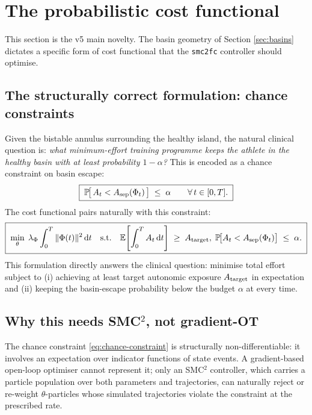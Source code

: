 \documentclass[11pt,a4paper]{article}
\theoremstyle{definition}
\newcommand{\dd}{\mathrm{d}}
\newcommand{\Ecal}{\mathbb{E}}
\newcommand{\Pcal}{\mathbb{P}}
\begin{document}
\section{The probabilistic cost functional} \label{sec:cost}

This section is the v5 main novelty. The basin geometry of Section
\ref{sec:basins} dictates a specific form of cost functional that the
\texttt{smc2fc} controller should optimise.

\subsection{The structurally correct formulation: chance constraints}

Given the bistable annulus surrounding the healthy island, the natural
clinical question is: \emph{what minimum-effort training programme
keeps the athlete in the healthy basin with at least probability $1 -
\alpha$?} This is encoded as a chance constraint on basin escape:
\begin{equation}
\boxed{\;
\Pcal\!\big[\, A_t < A_{\rm sep}(\Phi_t) \,\big] \;\le\; \alpha
   \qquad \forall\, t \in [0, T].
\;}
\label{eq:chance-constraint}
\end{equation}
The cost functional pairs naturally with this constraint:
\begin{equation}
\boxed{\;
\min_\theta \; \lambda_\Phi \int_0^T \|\Phi(t)\|^2 \, \dd t
\quad \text{s.t.}\quad
   \Ecal\!\left[ \int_0^T A_t \, \dd t \right] \;\ge\; A_{\rm target},\;
   \Pcal\!\big[ A_t < A_{\rm sep}(\Phi_t) \big] \;\le\; \alpha.
\;}
\label{eq:v5-min-effort}
\end{equation}
This formulation directly answers the clinical question: minimise total
effort subject to (i) achieving at least target autonomic exposure
$A_{\rm target}$ in expectation and (ii) keeping the basin-escape
probability below the budget $\alpha$ at every time.

\subsection{Why this needs SMC$^2$, not gradient-OT}

The chance constraint \eqref{eq:chance-constraint} is structurally
non-differentiable: it involves an expectation over indicator functions
of state events. A gradient-based open-loop optimiser cannot represent
it; only an SMC$^2$ controller, which carries a particle population
over both parameters and trajectories, can naturally reject or
re-weight $\theta$-particles whose simulated trajectories violate the
constraint at the prescribed rate.
\end{document}
